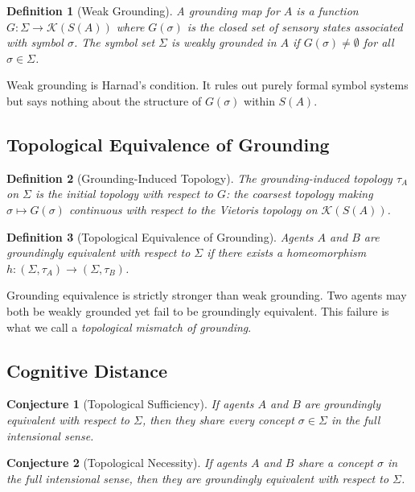 \documentclass[12pt]{article}
\newtheorem{definition}{Definition}
\newtheorem{conjecture}{Conjecture}
\begin{document}
\begin{definition}[Weak Grounding]
A grounding map for $A$ is a function $G : \Sigma \to \mathcal{K}(S(A))$
where $G(\sigma)$ is the closed set of sensory states associated with
symbol $\sigma$. The symbol set $\Sigma$ is \emph{weakly grounded}
in $A$ if $G(\sigma) \neq \emptyset$ for all $\sigma \in \Sigma$.
\end{definition}

Weak grounding is Harnad's condition. It rules out purely formal
symbol systems but says nothing about the structure of $G(\sigma)$
within $S(A)$.

\subsection{Topological Equivalence of Grounding}

\begin{definition}[Grounding-Induced Topology]
The grounding-induced topology $\tau_A$ on $\Sigma$ is the initial
topology with respect to $G$: the coarsest topology making
$\sigma \mapsto G(\sigma)$ continuous with respect to the Vietoris
topology on $\mathcal{K}(S(A))$.
\end{definition}

\begin{definition}[Topological Equivalence of Grounding]
Agents $A$ and $B$ are \emph{groundingly equivalent} with respect to
$\Sigma$ if there exists a homeomorphism
$h : (\Sigma, \tau_A) \to (\Sigma, \tau_B)$.
\end{definition}

Grounding equivalence is strictly stronger than weak grounding.
Two agents may both be weakly grounded yet fail to be groundingly
equivalent. This failure is what we call a \emph{topological mismatch
of grounding}.

\subsection{Cognitive Distance}

\begin{conjecture}[Topological Sufficiency]
If agents $A$ and $B$ are groundingly equivalent with respect to
$\Sigma$, then they share every concept $\sigma \in \Sigma$ in the
full intensional sense.
\end{conjecture}

\begin{conjecture}[Topological Necessity]
If agents $A$ and $B$ share a concept $\sigma$ in the full intensional
sense, then they are groundingly equivalent with respect to $\Sigma$.
\end{conjecture}
\end{document}
